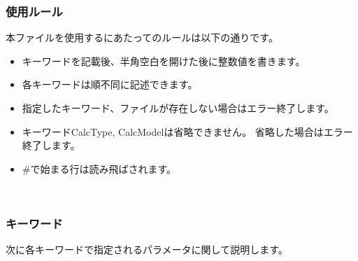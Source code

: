 \subsubsection{使用ルール}
本ファイルを使用するにあたってのルールは以下の通りです。
\begin{itemize}
\item キーワードを記載後、半角空白を開けた後に整数値を書きます。
\item 各キーワードは順不同に記述できます。
\item 指定したキーワード、ファイルが存在しない場合はエラー終了します。
\item キーワードCalcType, CalcModelは省略できません。 省略した場合はエラー終了します。
\item $\#$で始まる行は読み飛ばされます。
\end{itemize}
~\subsubsection{キーワード}
次に各キーワードで指定されるパラメータに関して説明します。
